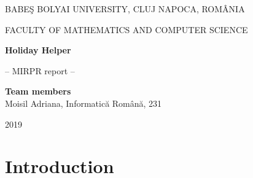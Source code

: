 \documentclass[runningheads,a4paper,11pt]{report}
\begin{document}
\begin{titlepage}
\sloppy
\begin{center}
BABE\c S BOLYAI UNIVERSITY, CLUJ NAPOCA, ROM\^ ANIA

FACULTY OF MATHEMATICS AND COMPUTER SCIENCE

\vspace{6cm}

\Huge \textbf{Holiday Helper}

\vspace{1cm}

\normalsize -- MIRPR report --

\end{center}


\vspace{5cm}

\begin{flushright}
\Large{\textbf{Team members}}\\
Moisil Adriana, Informatic\u a Rom\^ an\u a, 231\\
\end{flushright}

\vspace{4cm}

\begin{center}
2019
\end{center}

\end{titlepage}


%	


\tableofcontents

\newpage

\listoftables
\listoffigures
\listofalgorithms

\newpage




\newpage



 


\chapter{Introduction}
\label{chapter:introduction}
\end{document}
